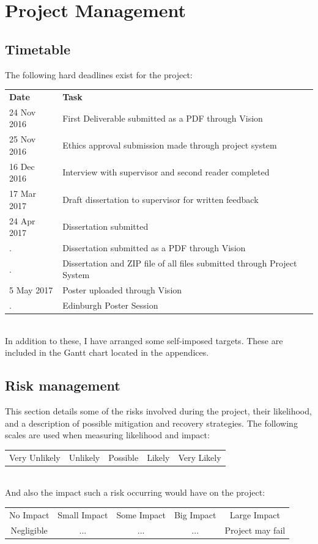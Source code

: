 \documentclass[a4paper,11pt]{report}
\begin{document}
\chapter{Project Management}
\section{Timetable}
The following hard deadlines exist for the project:\\
\begin{tabularx}{\textwidth}{lX}
\textbf{Date} & \textbf{Task}\\
24 Nov 2016 & First Deliverable submitted as a PDF through Vision\\
25 Nov 2016 & Ethics approval submission made through project system\\
16 Dec 2016 & Interview with supervisor and second reader completed\\
17 Mar 2017 & Draft dissertation to supervisor for written feedback\\
24 Apr 2017 & Dissertation submitted\\
. & Dissertation submitted as a PDF through Vision\\
. & Dissertation and ZIP file of all files submitted through Project System\\
 5 May 2017 & Poster uploaded through Vision\\
. & Edinburgh Poster Session
\end{tabularx}\\
In addition to these, I have arranged some self-imposed targets. These are included in the Gantt chart located in the appendices.

\section{Risk management}
This section details some of the risks involved during the project, their likelihood, and a description of possible mitigation and recovery strategies. The following scales are used when measuring likelihood and impact:\\
\begin{tabular}{c|c|c|c|c}
Very Unlikely & Unlikely & Possible & Likely & Very Likely
\end{tabular}\\
And also the impact such a risk occurring would have on the project:\\
\begin{tabular}{c|c|c|c|c}
 No Impact & Small Impact & Some Impact & Big Impact & Large Impact\\
 Negligible & ... & ... & ... & Project may fail
\end{tabular}\\
\end{document}
